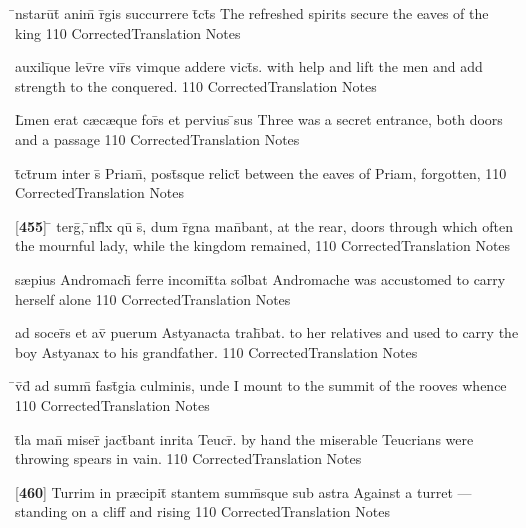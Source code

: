 \latline
  {\={}nstaru\={}t\={\macron {\i}} anim\={\macron {\i}} r\={}gis succurrere t\={}ct\={\macron {\i}}s}
  { The refreshed spirits secure the eaves of the king }
  {110}
  { CorrectedTranslation }
  { Notes }


\latline
  {auxili\={}que lev\={}re vir\={}s vimque addere vict\={\macron {\i}}s.}
  { with help and lift the men and add strength to the conquered. }
  {110}
  { CorrectedTranslation }
  { Notes }


\latline
  {L\={\macron {\i}}men erat c{\ae}c{\ae}que for\={}s et pervius \={}sus}
  { Three was a secret entrance, both doors and a passage }
  {110}
  { CorrectedTranslation }
  { Notes }


\latline
  {t\={}ct\={}rum inter s\={} Priam\={\macron {\i}}, post\={}sque relict\={\macron {\i}}}
  { between the eaves of Priam, forgotten,  }
  {110}
  { CorrectedTranslation }
  { Notes }


\latline
  {[\textbf{455}] \={} terg\={}, \={\macron {\i}}nf\={}l\={\macron {\i}}x qu\={} s\={}, dum r\={}gna man\={}bant,}
  { at the rear, doors through which often the mournful lady,  while the kingdom remained, }
  {110}
  { CorrectedTranslation }
  { Notes }


\latline
  {s{\ae}pius Andromach\={} ferre incomit\={}ta sol\={}bat}
  { Andromache was accustomed to carry herself alone }
  {110}
  { CorrectedTranslation }
  { Notes }


\latline
  {ad socer\={}s et av\={} puerum Astyanacta trah\={}bat.}
  { to her relatives and used to carry the boy Astyanax to his grandfather. }
  {110}
  { CorrectedTranslation }
  { Notes }


\latline
  {\={}v\={}d\={} ad summ\={\macron {\i}} fast\={\macron {\i}}gia culminis, unde}
  { I mount to the summit of the rooves whence }
  {110}
  { CorrectedTranslation }
  { Notes }


\latline
  {t\={}la man\={} miser\={\macron {\i}} jact\={}bant inrita Teucr\={\macron {\i}}.}
  { by hand the miserable Teucrians were throwing spears in vain. }
  {110}
  { CorrectedTranslation }
  { Notes }


\latline
  {[\textbf{460}] Turrim in pr{\ae}cipit\={\macron {\i}} stantem summ\={\macron {\i}}sque sub astra }
  { Against a turret --- standing on a cliff and rising }
  {110}
  { CorrectedTranslation }
  { Notes }


